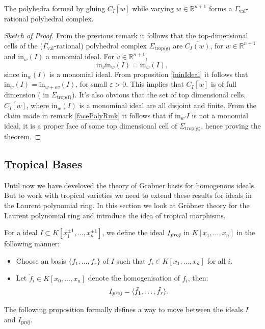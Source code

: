 \begin{theorem}
    \label{grobCompThe}
    The polyhedra formed by gluing $\overline{C_{I}[w]}$ while varying $w\in\mathbb{R}^{n+1}$ forms a $\Gamma_{\text{val}}$-rational polyhedral complex.
\end{theorem}
\begin{proof}[Sketch of Proof]
    From the previous remark it follows that the top-dimensional cells of the ($\Gamma_{\text{val}}$-rational) polyhedral complex $\Sigma_{\text{trop(g)}}$ are $\overline{C_{I}(w)}$, for $w \in \mathbb{R}^{n+1}$ and $\text{in}_{w}(I)$ a monomial ideal.
    For $v \in \mathbb{R}^{n+1}$,
    \[
        \text{in}_{v}\text{in}_{w}(I) = \text{in}_{w}(I),
    \]
    since $\text{in}_{w}(I)$ is a monomial ideal. 
    From proposition \ref{ininIdeal} it follows that $\text{in}_{w}(I) = \text{in}_{w + \varepsilon v}(I)$, for small $\varepsilon >0$.
    This implies that $\overline{C_{I}[w]}$ is of full dimension ( in $\Sigma_{\text{trop(f)}}$).
    It's also obvious that the set of top dimensional cells, $\overline{C_{I}[w]}$, where $\text{in}_{w}(I)$ is a monominal ideal are all disjoint and finite.
    From the claim made in remark \ref{facePolyRmk} it follows that if $\text{in}_{w'}I$ is not a monomial ideal, it is a proper face of some top dimensional cell of $\Sigma_{\text{trop(g)}}$, hence proving the theorem.
\end{proof}

\subsection{Tropical Bases}

Until now we have develoved the theory of Gr\"{o}bner basis for homogenous ideals.
But to work with tropical varieties we need to extend these results for ideals in the Laurent polynomial ring. 
In this section we look at Gr\"obner theory for the Laurent polynomial ring and introduce the idea of tropical morphisms.

\begin{definition}
    For a ideal $I \subset  K[x_{1}^{\pm1}, \dots, x_{n}^{\pm1}]$, we define the ideal $I_{\emph{proj}}$ in $K[x_{1},\dots,x_{n}]$ in the following manner:
    \begin{itemize}
        \item Choose an basis $\{f_{1},\dots,f_{r}\}$ of $I$ such that $f_{i} \in K[x_{1}, \dots, x_{n}]$ for all $i$.
        \item Let $\tilde f_{i} \in K[x_{0},\dots, x_{n}]$ denote the homogenisation of $f_{i}$, then:
            \[
                I_{\emph{proj}} = \langle \tilde f_{1}, \dots, \tilde f_{r} \rangle.
            \]
    \end{itemize}
\end{definition}
The following proposition formally defines a way to move between the ideals $I$ and $I_{\text{proj}}$.

